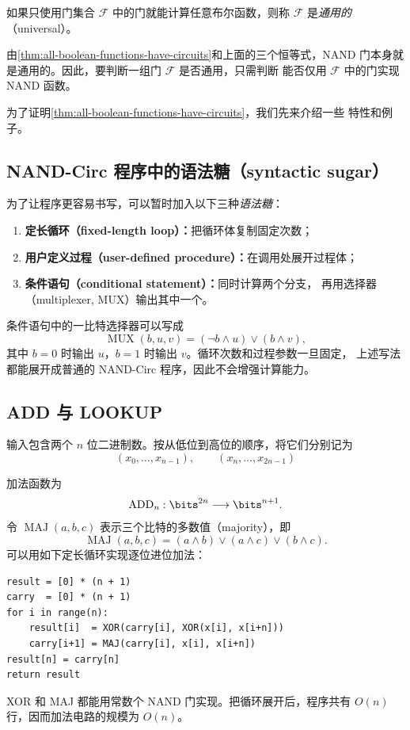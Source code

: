 \begin{definition}[通用门组]
  \label{def:universal-gate-set}
  如果只使用门集合 $\mathcal F$ 中的门就能计算任意布尔函数，则称
  $\mathcal F$ 是\emph{通用的}（universal）。
\end{definition}

由\cref{thm:all-boolean-functions-have-circuits}和上面的三个恒等式，NAND
门本身就是通用的。因此，要判断一组门 $\mathcal F$ 是否通用，只需判断
能否仅用 $\mathcal F$ 中的门实现 NAND 函数。

为了证明\cref{thm:all-boolean-functions-have-circuits}，我们先来介绍一些
特性和例子。

\subsection{NAND-Circ 程序中的语法糖（syntactic sugar）}

为了让程序更容易书写，可以暂时加入以下三种\emph{语法糖}：

\begin{enumerate}[label=\arabic*.]
  \item \textbf{定长循环（fixed-length loop）：}把循环体复制固定次数；
  \item \textbf{用户定义过程（user-defined procedure）：}在调用处展开过程体；
  \item \textbf{条件语句（conditional statement）：}同时计算两个分支，
    再用选择器（multiplexer, MUX）输出其中一个。
\end{enumerate}

条件语句中的一比特选择器可以写成
\[
  \operatorname{MUX}(b,u,v)
  =(\neg b\land u)\lor(b\land v),
\]
其中 $b=0$ 时输出 $u$，$b=1$ 时输出 $v$。循环次数和过程参数一旦固定，
上述写法都能展开成普通的 NAND-Circ 程序，因此不会增强计算能力。

\subsection{ADD 与 LOOKUP}

\begin{example}[ADD]
  \label{ex:add-circuit}
  输入包含两个 $n$ 位二进制数。按从低位到高位的顺序，将它们分别记为
  \[
    (x_0,\ldots,x_{n-1}),
    \qquad
    (x_n,\ldots,x_{2n-1})
  \]
  \par\noindent
  加法函数为
  \[
    \operatorname{ADD}_n:\bits^{2n}\longrightarrow\bits^{n+1}.
  \]
  令 $\operatorname{MAJ}(a,b,c)$ 表示三个比特的多数值（majority），即
  \[
    \operatorname{MAJ}(a,b,c)
    =(a\land b)\lor(a\land c)\lor(b\land c).
  \]
  可以用如下定长循环实现逐位进位加法：
\begin{verbatim}
result = [0] * (n + 1)
carry  = [0] * (n + 1)
for i in range(n):
    result[i]  = XOR(carry[i], XOR(x[i], x[i+n]))
    carry[i+1] = MAJ(carry[i], x[i], x[i+n])
result[n] = carry[n]
return result
\end{verbatim}
  XOR 和 MAJ 都能用常数个 NAND 门实现。把循环展开后，程序共有 $O(n)$
  行，因而加法电路的规模为 $O(n)$。
\end{example}

